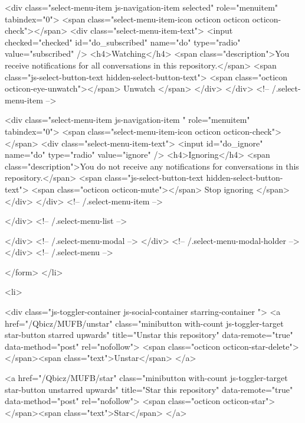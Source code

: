             <div class="select-menu-item js-navigation-item selected" role="menuitem" tabindex="0">
              <span class="select-menu-item-icon octicon octicon octicon-check"></span>
              <div class="select-menu-item-text">
                <input checked="checked" id="do_subscribed" name="do" type="radio" value="subscribed" />
                <h4>Watching</h4>
                <span class="description">You receive notifications for all conversations in this repository.</span>
                <span class="js-select-button-text hidden-select-button-text">
                  <span class="octicon octicon-eye-unwatch"></span>
                  Unwatch
                </span>
              </div>
            </div> <!-- /.select-menu-item -->

            <div class="select-menu-item js-navigation-item " role="menuitem" tabindex="0">
              <span class="select-menu-item-icon octicon octicon-check"></span>
              <div class="select-menu-item-text">
                <input id="do_ignore" name="do" type="radio" value="ignore" />
                <h4>Ignoring</h4>
                <span class="description">You do not receive any notifications for conversations in this repository.</span>
                <span class="js-select-button-text hidden-select-button-text">
                  <span class="octicon octicon-mute"></span>
                  Stop ignoring
                </span>
              </div>
            </div> <!-- /.select-menu-item -->

          </div> <!-- /.select-menu-list -->

        </div> <!-- /.select-menu-modal -->
      </div> <!-- /.select-menu-modal-holder -->
    </div> <!-- /.select-menu -->

</form>
    </li>

  <li>
  

  <div class="js-toggler-container js-social-container starring-container ">
    <a href="/Qbicz/MUFB/unstar"
      class="minibutton with-count js-toggler-target star-button starred upwards"
      title="Unstar this repository" data-remote="true" data-method="post" rel="nofollow">
      <span class="octicon octicon-star-delete"></span><span class="text">Unstar</span>
    </a>

    <a href="/Qbicz/MUFB/star"
      class="minibutton with-count js-toggler-target star-button unstarred upwards"
      title="Star this repository" data-remote="true" data-method="post" rel="nofollow">
      <span class="octicon octicon-star"></span><span class="text">Star</span>
    </a>

